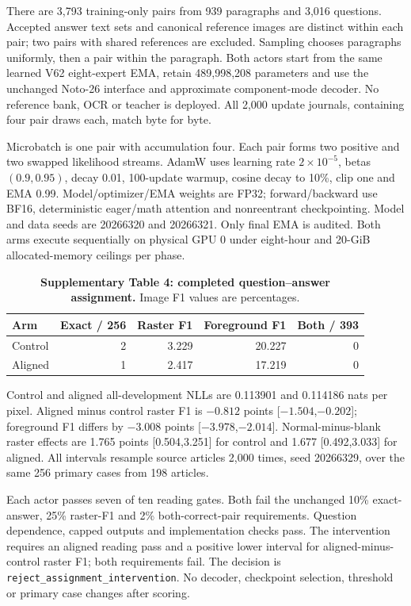 \documentclass[10pt,a4paper]{article}
\begin{document}
There are 3,793 training-only pairs from 939 paragraphs and 3,016 questions.
Accepted answer text sets and canonical reference images are distinct within
each pair; two pairs with shared references are excluded. Sampling chooses
paragraphs uniformly, then a pair within the paragraph. Both actors start
from the same learned V62 eight-expert EMA, retain 489,998,208 parameters and
use the unchanged Noto-26 interface and approximate component-mode decoder.
No reference bank, OCR or teacher is deployed. All 2,000 update journals,
containing four pair draws each, match byte for byte.

Microbatch is one pair with accumulation four. Each pair forms two positive
and two swapped likelihood streams. AdamW uses learning rate $2\times10^{-5}$,
betas $(0.9,0.95)$, decay 0.01, 100-update warmup, cosine decay to 10\%, clip
one and EMA 0.99. Model/optimizer/EMA weights are FP32; forward/backward use
BF16, deterministic eager/math attention and nonreentrant checkpointing.
Model and data seeds are 20266320 and 20266321. Only final EMA is audited.
Both arms execute sequentially on physical GPU 0 under eight-hour and
20-GiB allocated-memory ceilings per phase.

\begin{table}[htbp]\centering\small
\caption*{\textbf{Supplementary Table 4: completed question--answer assignment.} Image F1 values are percentages.}
\begin{tabular}{lrrrr}\toprule
Arm & Exact / 256 & Raster F1 & Foreground F1 & Both / 393\\\midrule
Control & 2 & 3.229 & 20.227 & 0\\
Aligned & 1 & 2.417 & 17.219 & 0\\\bottomrule
\end{tabular}
\end{table}

Control and aligned all-development NLLs are 0.113901 and 0.114186 nats per
pixel. Aligned minus control raster F1 is $-0.812$ points [$-1.504$,$-0.202$];
foreground F1 differs by $-3.008$ points [$-3.978$,$-2.014$]. Normal-minus-blank
raster effects are 1.765 points [0.504,3.251] for control and 1.677
[0.492,3.033] for aligned. All intervals resample source articles 2,000 times,
seed 20266329, over the same 256 primary cases from 198 articles.

Each actor passes seven of ten reading gates. Both fail the unchanged 10\%
exact-answer, 25\% raster-F1 and 2\% both-correct-pair requirements. Question
dependence, capped outputs and implementation checks pass. The intervention
requires an aligned reading pass and a positive lower interval for
aligned-minus-control raster F1; both requirements fail. The decision is
\texttt{reject\_assignment\_intervention}. No decoder, checkpoint selection,
threshold or primary case changes after scoring.
\end{document}
